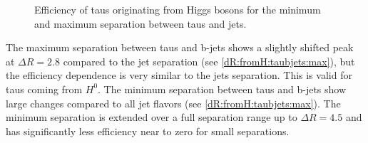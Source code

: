 \begin{figure}
\begin{subfigure}[t]{0.49\textwidth}
                \label{dR:fromH:taujets:max}
                \end{subfigure}
\caption[Efficiency of taus originating from Higgs bosons for the separation between taus and jets.]{Efficiency of taus originating from Higgs bosons for the minimum and maximum separation between taus and jets.}
\label{dR:fromH:taujets}
\end{figure}
%
The maximum separation between taus and b-jets shows a slightly shifted peak at $\Delta R=2.8$ compared to the jet separation (see \ref{dR:fromH:taubjets:max}), but the efficiency dependence is very similar to the jets separation. This is valid for taus coming from $H^0$.  The minimum separation between taus and b-jets show large changes compared to all jet flavors (see \ref{dR:fromH:taubjets:max}). The minimum separation is extended over a full separation range up to $\Delta R=4.5$ and has significantly less efficiency near to zero for small separations.
%
